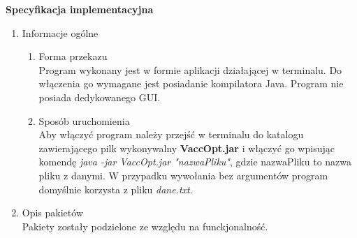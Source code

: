 \documentclass[11pt]{article}
\begin{document}
\begin{huge}
\begin{center}
\textbf{Specyfikacja implementacyjna}
\end{center}
\end{huge}

 \renewcommand{\labelenumii}{\Roman{enumii}}
 \begin{enumerate}
 
 \item Informacje ogólne
 
 \begin{enumerate}[label=\arabic{enumi}.\arabic*.]
 
\item Forma przekazu\\
 Program wykonany jest w formie aplikacji działającej w terminalu. Do włączenia go wymagane jest posiadanie kompilatora Java. Program nie posiada dedykowanego GUI.
\item Sposób uruchomienia\\
 Aby włączyć program należy przejść w terminalu do katalogu zawierającego pilk wykonywalny \textbf{VaccOpt.jar} i włączyć go wpisując komendę \textsl{java -jar VaccOpt.jar "nazwaPliku"}, gdzie nazwaPliku to nazwa pliku z danymi. W przypadku wywołania bez argumentów program domyślnie korzysta z pliku \textsl{dane.txt}.
 \end{enumerate}
 
 
 
\item Opis pakietów\\
Pakiety zostały podzielone ze względu na funckjonalność.


\end{enumerate}
\end{document}
